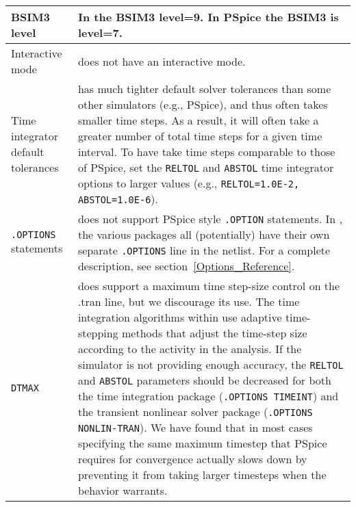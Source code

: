 \begin{longtable}[h] {>{\raggedright\small}m{2in}|>{\raggedright\let\\\tabularnewline\small}m{4in}}
BSIM3 level & In \Xyce{} the BSIM3 level=9.  In PSpice the BSIM3 is
level=7. \\ \hline

Interactive mode & \Xyce{} does not have an interactive mode.  \\ \hline

Time integrator default tolerances & \Xyce{} has much tighter default solver
tolerances than some other simulators (e.g., PSpice), and thus often takes
smaller time steps.  As a result, it will often take a greater number of total
time steps for a given time interval.  To have \Xyce{} take time steps
comparable to those of PSpice, set the \texttt{RELTOL} and \texttt{ABSTOL} time
integrator options to larger values (e.g., \texttt{RELTOL=1.0E-2, ABSTOL=1.0E-6}).
\\ \hline

{\tt.OPTIONS} statements \index{\texttt{.OPTIONS}} & \Xyce{} does 
not support PSpice style
\texttt{.OPTION} statements. In \Xyce{}, the various packages all (potentially)
have their own separate \texttt{.OPTIONS} line in the netlist.  For a complete
description, see section~\ref{Options_Reference}.  \\ \hline

\texttt{DTMAX} & \Xyce{} does support a maximum time step-size
control on the .tran line, but we discourage its use. The time 
integration\index{solvers!time integration}
\index{algorithm!time integration} algorithms within
\Xyce{} use adaptive time-stepping methods that adjust the time-step
size\index{time step!size} according to the activity in the analysis.  If the
simulator is not providing enough accuracy, the \texttt{RELTOL} and
\texttt{ABSTOL} parameters should be decreased for both the time integration
package (\texttt{.OPTIONS TIMEINT}) and the transient nonlinear solver package
(\texttt{.OPTIONS NONLIN-TRAN}).  We have found that in most cases specifying 
the same maximum timestep that PSpice requires for convergence actually 
slows \Xyce{} down by preventing it from taking larger timesteps when the 
behavior warrants.  \\ \hline



\end{longtable}
